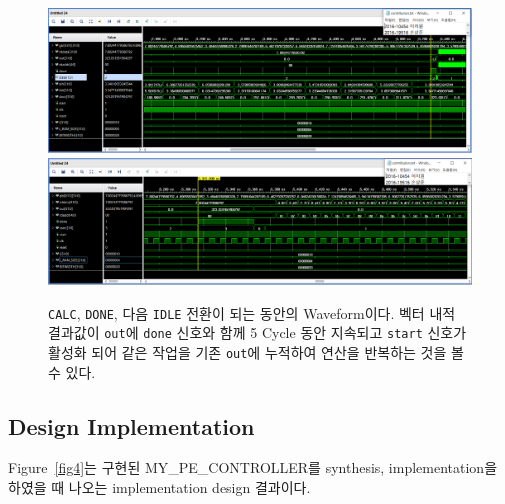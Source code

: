 \documentclass{article}
\begin{document}
\begin{figure}[htb!]
	\centering
	\includegraphics[width=1.0\textwidth]{fig/My_PE_Controller_Waveform4.png}
	\includegraphics[width=1.0\textwidth]{fig/My_PE_Controller_Waveform5.png}
\caption{\texttt{CALC}, \texttt{DONE}, 다음 \texttt{IDLE} 전환이 되는 동안의 Waveform이다. 벡터 내적 결과값이 \texttt{out}에 \texttt{done} 신호와 함께 5 Cycle 동안 지속되고 \texttt{start} 신호가 활성화 되어 같은 작업을 기존 \texttt{out}에 누적하여 연산을 반복하는 것을 볼 수 있다.}
\label{fig3}
\end{figure}

\newpage
\subsection{Design Implementation}
Figure~\ref{fig4}는 구현된 MY\_PE\_CONTROLLER를 synthesis, implementation을 하였을 때 나오는 implementation design 결과이다.
\end{document}
